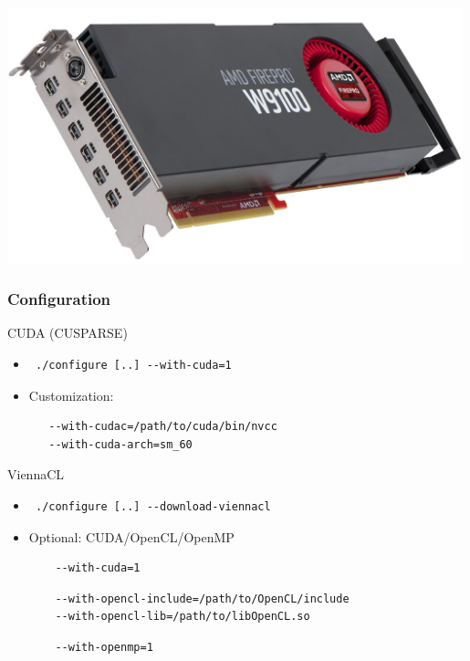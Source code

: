 \begin{frame}[fragile]
\begin{minipage}{0.23\textwidth}
 \includegraphics[width=0.99\textwidth]{figures/w9100.jpg} \\[1.5em]
 \end{minipage}


\end{frame}


\begin{frame}[fragile]
\frametitle{Configuration}
  \begin{block}{CUDA (CUSPARSE)}
    \begin{itemize}
     \item 
     \begin{lstlisting}
 ./configure [..] --with-cuda=1
     \end{lstlisting}
     \item Customization:
     \begin{lstlisting}
   --with-cudac=/path/to/cuda/bin/nvcc
   --with-cuda-arch=sm_60
     \end{lstlisting}
    \end{itemize}
  \end{block}
  
  \vspace*{-0.5cm}
  \begin{block}{ViennaCL}
    \begin{itemize}
     \item
     \begin{lstlisting}
 ./configure [..] --download-viennacl
     \end{lstlisting}
     \item Optional: CUDA/OpenCL/OpenMP
     \begin{lstlisting}
    --with-cuda=1
     \end{lstlisting}
     \begin{lstlisting}
    --with-opencl-include=/path/to/OpenCL/include
    --with-opencl-lib=/path/to/libOpenCL.so
     \end{lstlisting}
     \begin{lstlisting}
    --with-openmp=1
     \end{lstlisting}
    \end{itemize}
  \end{block}
\end{frame}


